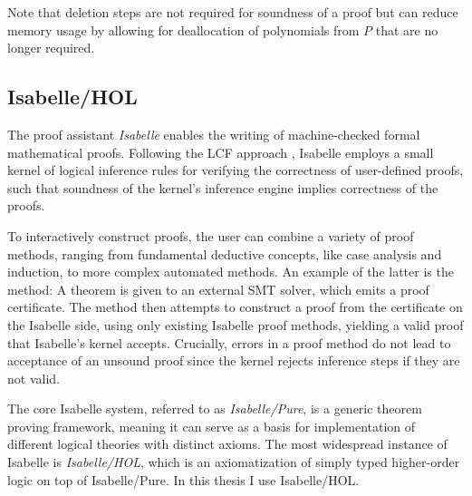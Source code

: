 Note that deletion steps are not required for soundness of a proof but can reduce memory usage by allowing for deallocation of polynomials from $P$ that are no longer required.

\subsection{Isabelle/HOL}\label{sec:isabelle-hol}

The proof assistant \textit{Isabelle} \cite{isabelle} enables the writing of machine-checked formal mathematical proofs.
Following the LCF approach \cite{computational-logic-origins}, Isabelle employs a small kernel of logical inference rules for verifying the correctness of user-defined proofs, such that soundness of the kernel's inference engine implies correctness of the proofs.

To interactively construct proofs, the user can combine a variety of proof methods, ranging from fundamental deductive concepts, like case analysis and induction, to more complex automated methods.
An example of the latter is the  method: A theorem is given to an external SMT solver, which emits a proof certificate.
The  method then attempts to construct a proof from the certificate on the Isabelle side, using only existing Isabelle proof methods, yielding a valid proof that Isabelle's kernel accepts.
Crucially, errors in a proof method do not lead to acceptance of an unsound proof since the kernel rejects inference steps if they are not valid.

The core Isabelle system, referred to as \textit{Isabelle/Pure}, is a generic theorem proving framework, meaning it can serve as a basis for implementation of different logical theories with distinct axioms.
The most widespread instance of Isabelle is \textit{Isabelle/HOL}, which is an axiomatization of simply typed higher-order logic on top of Isabelle/Pure.
In this thesis I use Isabelle/HOL.


